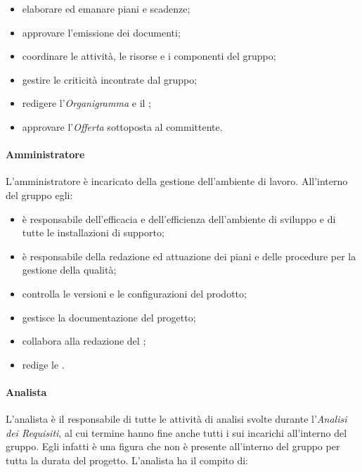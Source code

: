 			\begin{itemize}
				\item elaborare ed emanare piani e scadenze;
				\item approvare l'emissione dei documenti;
				\item coordinare le attività, le risorse e i componenti del gruppo;
				\item gestire le criticità incontrate dal gruppo;
				\item redigere l'\textit{Organigramma} e il ;
				\item approvare l'\textit{Offerta} sottoposta al committente.
			\end{itemize}
		
		\paragraph{Amministratore}
		
			L'amministratore è incaricato della gestione dell'ambiente di lavoro.
			\newline
			All'interno del gruppo egli:
			
			\begin{itemize}
				\item è responsabile dell'efficacia e dell'efficienza dell'ambiente di sviluppo e di tutte le installazioni di supporto;
				\item è responsabile della redazione ed attuazione dei piani e delle procedure per la gestione della qualità;
				\item controlla le versioni e le configurazioni del prodotto;
				\item gestisce la documentazione del progetto;
				\item collabora alla redazione del ;
				\item redige le .
			\end{itemize}
		
		\paragraph{Analista}
		
			L'analista è il responsabile di tutte le attività di analisi svolte durante l'\textit{Analisi dei Requisiti}, al cui termine hanno fine anche tutti i sui incarichi all'interno del gruppo. Egli infatti è una figura che non è presente all'interno del gruppo per tutta la durata del progetto.
			\newline
			L'analista ha il compito di:
			
